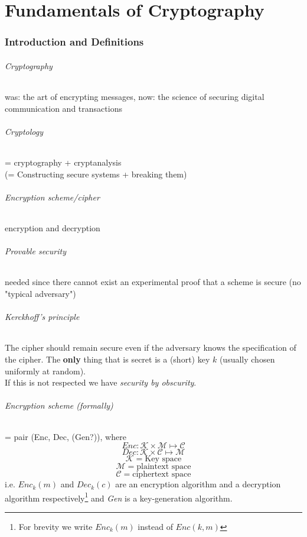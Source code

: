 %
%
\part{Fundamentals of Cryptography}

%
%
\section{Introduction and Definitions}

\paragraph{Cryptography} was: the art of encrypting messages, now: the science of securing digital communication and transactions

\paragraph{Cryptology} = cryptography + cryptanalysis \\
\hspace*{22mm}(= Constructing secure systems + breaking them)

\paragraph{Encryption scheme/cipher} encryption and decryption

\paragraph{Provable security} needed since there cannot exist an experimental proof that a scheme is secure (no "typical adversary")

\paragraph{Kerckhoff's principle} 
The cipher should remain secure even if the adversary knows the specification of the cipher. The \textbf{only} thing that is secret is a (short) key $k$ (usually chosen uniformly at random). \\
If this is not respected we have \textit{security by obscurity}.

\paragraph{Encryption scheme (formally)} = pair (Enc, Dec, (Gen?)), where \\
$$ Enc: \mathcal{K} \times \mathcal{M} \mapsto \mathcal{C}$$
$$ Dec: \mathcal{K} \times \mathcal{C} \mapsto \mathcal{M} $$
$$\mathcal{K} = \text{Key space} $$
$$\mathcal{M} = \text{plaintext space} $$
$$\mathcal{C} = \text{ciphertext space} $$
i.e. $Enc_k(m)$ and $Dec_k(c)$ are an encryption algorithm and a decryption algorithm respectively\footnote{For brevity we write $Enc_k(m)$ instead of $Enc(k, m)$} and \textit{Gen} is a key-generation algorithm.

